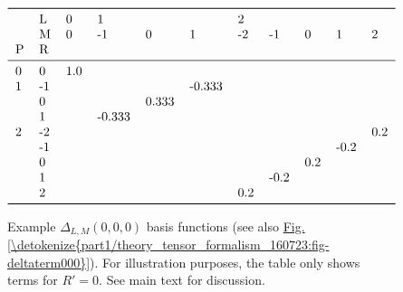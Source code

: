 \documentclass[letterpaper,table,10pt,english]{jupyterBook}
\begin{document}
\begin{figure}[htbp]
\centering
\capstart
\begin{equation*}
\begin{split}\begin{tabular}{lllllllllll}
\toprule
  & L &    0 & \multicolumn{3}{l}{1} & \multicolumn{5}{l}{2} \\
  & M &    0 &     -1 &      0 &      1 &   -2 &   -1 &    0 &    1 &    2 \\
P & R &      &        &        &        &      &      &      &      &      \\
\midrule
0 &  0 &  1.0 &        &        &        &      &      &      &      &      \\
1 & -1 &      &        &        & -0.333 &      &      &      &      &      \\
  &  0 &      &        &  0.333 &        &      &      &      &      &      \\
  &  1 &      & -0.333 &        &        &      &      &      &      &      \\
2 & -2 &      &        &        &        &      &      &      &      &  0.2 \\
  & -1 &      &        &        &        &      &      &      & -0.2 &      \\
  &  0 &      &        &        &        &      &      &  0.2 &      &      \\
  &  1 &      &        &        &        &      & -0.2 &      &      &      \\
  &  2 &      &        &        &        &  0.2 &      &      &      &      \\
\bottomrule
\end{tabular}\end{split}
\end{equation*}\caption{Example \(\Delta_{L,M}(0,0,0)\) basis functions (see also \hyperref[\detokenize{part1/theory_tensor_formalism_160723:fig-deltaterm000}]{Fig.\@ \ref{\detokenize{part1/theory_tensor_formalism_160723:fig-deltaterm000}}}). For illustration purposes, the table only shows terms for \(R'=0\). See main text for discussion.}\label{\detokenize{part1/theory_tensor_formalism_160723:tab-deltaterm000}}\end{figure}
\end{document}
